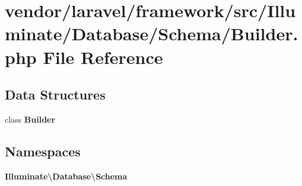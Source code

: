 \section{vendor/laravel/framework/src/\+Illuminate/\+Database/\+Schema/\+Builder.php File Reference}
\label{laravel_2framework_2src_2_illuminate_2_database_2_schema_2_builder_8php}
\subsection*{Data Structures}
\begin{DoxyCompactItemize}
\item 
class {\bf Builder}
\end{DoxyCompactItemize}
\subsection*{Namespaces}
\begin{DoxyCompactItemize}
\item 
 {\bf Illuminate\textbackslash{}\+Database\textbackslash{}\+Schema}
\end{DoxyCompactItemize}
